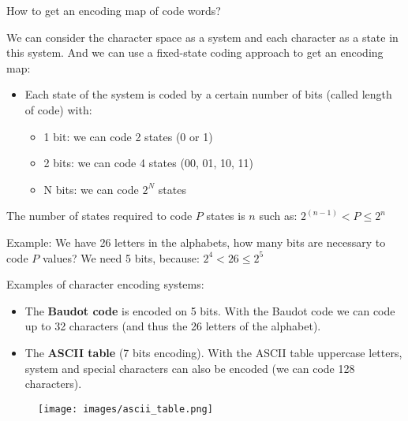 \documentclass[handout]{beamer}[10pt, usepdftitle=false]
\begin{document}
	\begin{frame}
	
	How to get an encoding map of code words?
	\vspace*{0.6em}
	
	We can consider the character space as a system and each character as a state in this system. And we can use a fixed-state coding approach to get an encoding map:
	
	\vspace*{0.6em}	
	
	\begin{itemize}
	\item{Each state of the system is coded by a certain number of bits (called length of code) with:
		\begin{itemize}
			\item{1 bit: we can code 2 states (0 or 1)}
			\item{2 bits: we can code 4 states (00, 01, 10, 11)}
			\item{N bits: we can code $2^N$ states}
		\end{itemize}
	}	
	
	\end{itemize}
	
	The number of states required to code $P$ states is $n$ such as: 
	$2^{(n-1)} < P \leq 2^n$  	
		\vspace*{1em}	
	
	Example: We have 26 letters in the alphabets, how many bits are necessary to code $P$ values?
	We need 5 bits, because: $2^4 < 26 \leq 2^5$	
	
	
	\end{frame}
	
	
	\begin{frame}

	Examples of character encoding systems:
		\vspace*{1em}	
	
	\begin{itemize}
	
	\item{The \textbf{Baudot code} is encoded on 5 bits. With the Baudot code we can code up to 32 characters (and thus the 26 letters of the alphabet).}
	\item{The \textbf{ASCII table} (7 bits encoding). With the ASCII table uppercase letters, system and special characters can also be encoded (we can code 128 characters).}
	
	\end{itemize}
	
		
	\begin{center}	
	\begin{figure}
		\texttt{[image: images/ascii\_table.png]} 
	\end{figure}	
	\end{center}		
	
	
	\end{frame}
\end{document}
